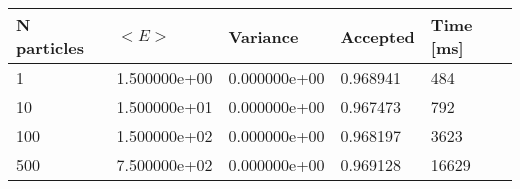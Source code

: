 \begin{table}[h!]
\begin{tabular}{|l|l|l|l|l|}
\hline 
N particles & $<E>$ & Variance & Accepted & Time [ms]\\ 
 \hline 
1 & 1.500000e+00 & 0.000000e+00 & 0.968941 & 484 \\ \hline 
10 & 1.500000e+01 & 0.000000e+00 & 0.967473 & 792 \\ \hline 
100 & 1.500000e+02 & 0.000000e+00 & 0.968197 & 3623 \\ \hline 
500 & 7.500000e+02 & 0.000000e+00 & 0.969128 & 16629 \\ \hline 
\end{tabular}
\label{h:a3} 
\end{table}
